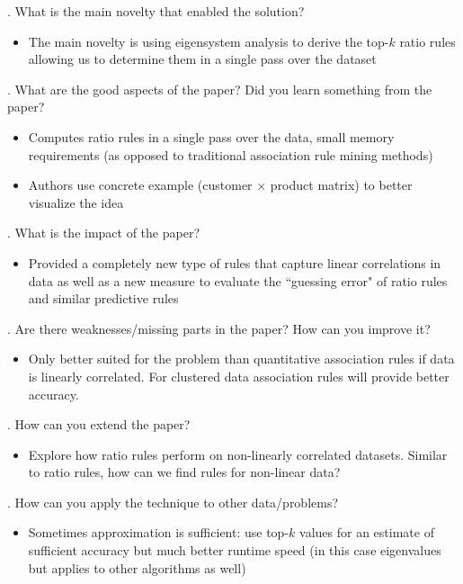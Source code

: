 \documentclass[12pt]{article}
\begin{document}
. What is the main novelty that enabled the solution?

\begin{itemize}
    \item The main novelty is using eigensystem analysis to derive the top-$k$ ratio rules allowing us to determine them in a single pass over the dataset
\end{itemize}

. What are the good aspects of the paper? Did you learn something from the paper?

\begin{itemize}
    \item Computes ratio rules in a single pass over the data, small memory requirements (as opposed to traditional association rule mining methods)
    \item Authors use concrete example (customer $\times$ product matrix) to better visualize the idea
\end{itemize}

. What is the impact of the paper?

\begin{itemize}
    \item Provided a completely new type of rules that capture linear correlations in data as well as a new measure to evaluate the ``guessing error" of ratio rules and similar predictive rules
\end{itemize}

. Are there weaknesses/missing parts in the paper? How can you improve it?

\begin{itemize}
    \item Only better suited for the problem than quantitative association rules if data is linearly correlated. For clustered data association rules will provide better accuracy. 
\end{itemize}

. How can you extend the paper?

\begin{itemize}
    \item Explore how ratio rules perform on non-linearly correlated datasets. Similar to ratio rules, how can we find rules for non-linear data?
\end{itemize}

. How can you apply the technique to other data/problems?

\begin{itemize}
    \item Sometimes approximation is sufficient: use top-$k$ values for an estimate of sufficient accuracy but much better runtime speed (in this case eigenvalues but applies to other algorithms as well)
\end{itemize}
\end{document}

